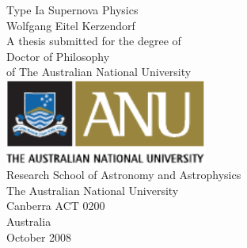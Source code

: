 \documentclass[11pt,openright]{report}
\makeatletter
\newcommand{\thesistitle}{Type Ia Supernova Physics}
\newcommand{\fullname}{Wolfgang Eitel Kerzendorf}
\def\cleardoublepage{\clearpage\if@twoside \ifodd\c@page\else
	\hbox{}
	\vspace*{\fill}
	\thispagestyle{empty}
	\newpage
	\if@twocolumn\hbox{}\newpage\fi\fi\fi}
\makeatother
\begin{document}
\pagestyle{empty}

%
%
%
%
\begin{titlepage}\selectfont
  \begin{center}
    \LARGE{\thesistitle}
    \\[2cm]
    \Large{\fullname}
    \\[2cm]
    \normalsize{A thesis submitted for the degree of\\[0.5cm]
      Doctor of Philosophy\\[0.5cm]
      of The Australian National University}
    \\[1.5cm]
    \includegraphics[width=0.5\textwidth]{anu-logo-colour}
    \\[1.5cm]
    \large{Research School of Astronomy and Astrophysics \\[0.25cm]
      The Australian National University \\[0.25cm]
      Canberra ACT 0200 \\[0.25cm]
      Australia}
    \\[2cm]
    \textsf{October 2008}
  \end{center}
\end{titlepage}

%
%


%
%
\pagestyle{plain}
\setlength{\parindent}{0pt}
\setlength{\parskip}{1ex plus 0.5ex minus 0.2ex}
%

%

%

%
\tableofcontents\cleardoublepage
\listoffigures\cleardoublepage
\listoftables\cleardoublepage
\end{document}
